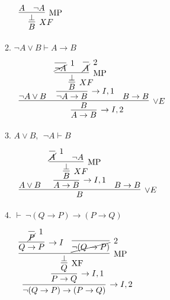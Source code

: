 \documentclass[11pt]{report}
\begin{document}
\begin{enumerate}
\begin{enumerate}
		 \begin{mdframed}
			 \begin{center}
			 $\begin{array}{c}
				 \infer[XF]{B}
					 {\infer[\MP]{\bot}
						 {A & \lnot A}}			
			 \end{array}$
			 \end{center}
		 \end{mdframed}

	   \item $\neg A \lor B \vdash  A \to B$ 

	   \hspace{0.2cm}{\bf Solution}

		\begin{mdframed}
			\begin{center}
				$\begin{array}{c}
					\infer[\to I,2]{A \to B}
						{\infer[\lor E]{B}
							{\lnot A \lor B
							&
							\infer[\to I,1]{\lnot A \to B}
								{\infer[XF]{B}
									{\infer[\MP]{\bot}
										{\infer[1]{\cancel{\lnot A}}{}
										&
										\infer[2]{\cancel{A}}{}}}}
							&
							B \to B}}
				\end{array}$
			\end{center}
		\end{mdframed}

	   \item $A \lor B,\ \ \lnot A \vdash  B$ 
	   
	   \hspace{0.2cm}{\bf Solution}
		
	    \begin{mdframed}
			\begin{center}
				$\begin{array}{c}
					\infer[\lor E]{B}
						{A \lor B
						&
						\infer[\to I,1]{A \to B}
							{\infer[XF]{B}
								{\infer[\MP]{\bot}
									{\infer[1]{\cancel{A}}{}
									&
									\lnot A}}}
						&
						B \to B}
				\end{array}$
			\end{center}
		\end{mdframed}

		\item $ \vdash \ \lnot(Q \to P) \to (P \to Q)$
		
		\hspace{0.2cm}{\bf Solution}

			\begin{mdframed}
				\begin{center}
					$\begin{array}{c}
						\infer[\to I,2]{\lnot(Q \to P) \to (P \to Q)}
							{\infer[\to I,1]{P \to Q}
								{\infer[\XF]{Q}
									{\infer[\MP]{\bot}	
										{\infer[\to I]{Q \to P}
											{\infer[1]{\cancel{P}}{}}
										&
										\infer[2]{\cancel{\lnot(Q \to P)}}{}}}}}
					\end{array}$
				\end{center}
			\end{mdframed}

	\end{enumerate}

\end{enumerate}	
\end{document}

